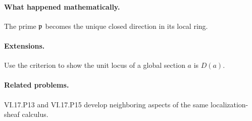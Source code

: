 \paragraph{What happened mathematically.}
The prime $\mathfrak p$ becomes the unique closed direction in its local ring.

\paragraph{Extensions.}
Use the criterion to show the unit locus of a global section $a$ is $D(a)$.

\paragraph{Related problems.}
VI.17.P13 and VI.17.P15 develop neighboring aspects of the same localization-sheaf calculus.
\fi
